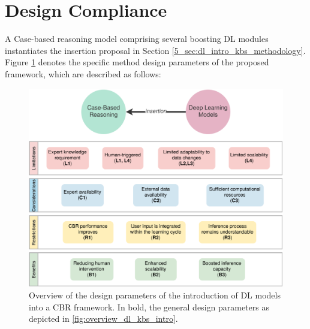 \color{black}
\section{Design Compliance}\label{5_sec:design_compliance}
A Case-based reasoning model comprising several boosting DL modules instantiates the insertion proposal in Section \ref{5_sec:dl_intro_kbs_methodology}. Figure \ref{fig:compliance_dl_into_kbs} denotes the specific method design parameters of the proposed framework, which are described as follows:

\begin{figure}[t]
    \centering
    \includegraphics[width=\linewidth]{5_dlintegrationkbs/figures/Instance_DL_intro_KBS.eps}
    \caption{Overview of the design parameters of the introduction of DL models into a CBR framework. In bold, the general design parameters as depicted in \ref{fig:overview_dl_kbs_intro}.}
    \label{fig:compliance_dl_into_kbs}
\end{figure}

